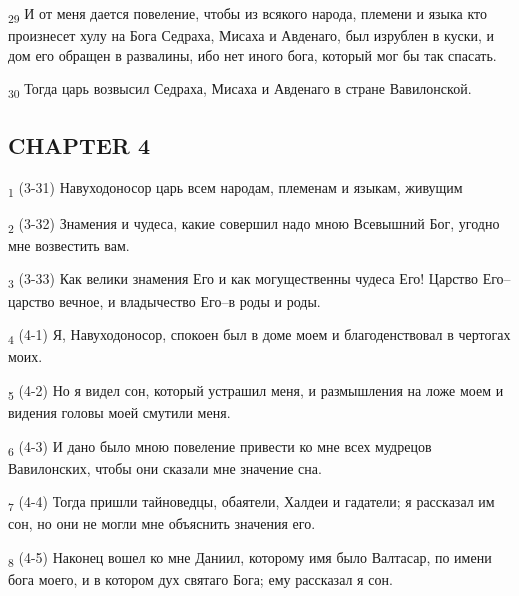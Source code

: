 \begin{tcolorbox}
\textsubscript{29} И от меня дается повеление, чтобы из всякого народа, племени и языка кто произнесет хулу на Бога Седраха, Мисаха и Авденаго, был изрублен в куски, и дом его обращен в развалины, ибо нет иного бога, который мог бы так спасать.
\end{tcolorbox}
\begin{tcolorbox}
\textsubscript{30} Тогда царь возвысил Седраха, Мисаха и Авденаго в стране Вавилонской.
\end{tcolorbox}
\subsection{CHAPTER 4}
\begin{tcolorbox}
\textsubscript{1} (3-31) Навуходоносор царь всем народам, племенам и языкам, живущим
\end{tcolorbox}
\begin{tcolorbox}
\textsubscript{2} (3-32) Знамения и чудеса, какие совершил надо мною Всевышний Бог, угодно мне возвестить вам.
\end{tcolorbox}
\begin{tcolorbox}
\textsubscript{3} (3-33) Как велики знамения Его и как могущественны чудеса Его! Царство Его--царство вечное, и владычество Его--в роды и роды.
\end{tcolorbox}
\begin{tcolorbox}
\textsubscript{4} (4-1) Я, Навуходоносор, спокоен был в доме моем и благоденствовал в чертогах моих.
\end{tcolorbox}
\begin{tcolorbox}
\textsubscript{5} (4-2) Но я видел сон, который устрашил меня, и размышления на ложе моем и видения головы моей смутили меня.
\end{tcolorbox}
\begin{tcolorbox}
\textsubscript{6} (4-3) И дано было мною повеление привести ко мне всех мудрецов Вавилонских, чтобы они сказали мне значение сна.
\end{tcolorbox}
\begin{tcolorbox}
\textsubscript{7} (4-4) Тогда пришли тайноведцы, обаятели, Халдеи и гадатели; я рассказал им сон, но они не могли мне объяснить значения его.
\end{tcolorbox}
\begin{tcolorbox}
\textsubscript{8} (4-5) Наконец вошел ко мне Даниил, которому имя было Валтасар, по имени бога моего, и в котором дух святаго Бога; ему рассказал я сон.
\end{tcolorbox}
